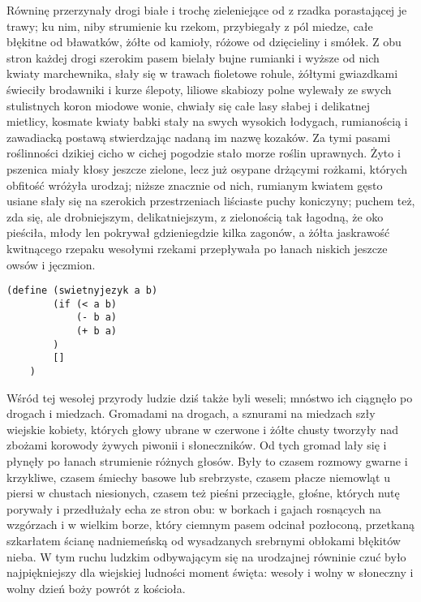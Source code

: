 \documentclass{article}
\begin{document}
Równinę przerzynały drogi białe i trochę zieleniejące od z rzadka porastającej je trawy; ku nim, niby strumienie ku rzekom, przybiegały z pól miedze, całe błękitne od bławatków, żółte od kamioły, różowe od dzięcieliny i smółek. Z obu stron każdej drogi szerokim pasem bielały bujne rumianki i wyższe od nich kwiaty marchewnika, słały się w trawach fioletowe rohule, żółtymi gwiazdkami świeciły brodawniki i kurze ślepoty, liliowe skabiozy polne wylewały ze swych stulistnych koron miodowe wonie, chwiały się całe lasy słabej i delikatnej mietlicy, kosmate kwiaty babki stały na swych wysokich łodygach, rumianością i zawadiacką postawą stwierdzając nadaną im nazwę kozaków. Za tymi pasami roślinności dzikiej cicho w cichej pogodzie stało morze roślin uprawnych. Żyto i pszenica miały kłosy jeszcze zielone, lecz już osypane drżącymi rożkami, których obfitość wróżyła urodzaj; niższe znacznie od nich, rumianym kwiatem gęsto usiane słały się na szerokich przestrzeniach liściaste puchy koniczyny; puchem też, zda się, ale drobniejszym, delikatniejszym, z zielonością tak łagodną, że oko pieściła, młody len pokrywał gdzieniegdzie kilka zagonów, a żółta jaskrawość kwitnącego rzepaku wesołymi rzekami przepływała po łanach niskich jeszcze owsów i jęczmion.

\begin{lstlisting}[language=racket]
    (define (swietnyjezyk a b)
        (if (< a b)
            (- b a)
            (+ b a)
        )
        []
    )
\end{lstlisting}
\kdowod

Wśród tej wesołej przyrody ludzie dziś także byli weseli; mnóstwo ich ciągnęło po drogach i miedzach. Gromadami na drogach, a sznurami na miedzach szły wiejskie kobiety, których głowy ubrane w czerwone i żółte chusty tworzyły nad zbożami korowody żywych piwonii i słoneczników. Od tych gromad lały się i płynęły po łanach strumienie różnych głosów. Były to czasem rozmowy gwarne i krzykliwe, czasem śmiechy basowe lub srebrzyste, czasem płacze niemowląt u piersi w chustach niesionych, czasem też pieśni przeciągłe, głośne, których nutę porywały i przedłużały echa ze stron obu: w borkach i gajach rosnących na wzgórzach i w wielkim borze, który ciemnym pasem odcinał pozłoconą, przetkaną szkarłatem ścianę nadniemeńską od wysadzanych srebrnymi obłokami błękitów nieba. W tym ruchu ludzkim odbywającym się na urodzajnej równinie czuć było najpiękniejszy dla wiejskiej ludności moment święta: wesoły i wolny w słoneczny i wolny dzień boży powrót z kościoła.
\end{document}
